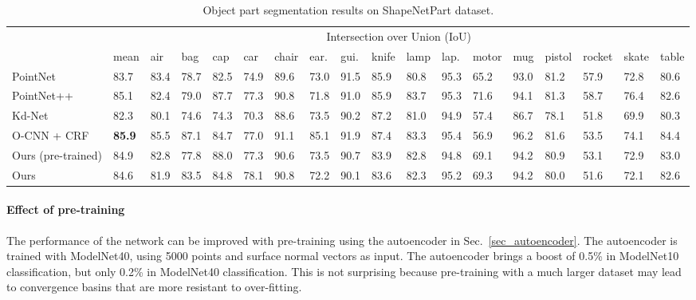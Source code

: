 \documentclass[10pt,twocolumn,letterpaper]{article}
\begin{document}
\begin{table*}[t]
\centering
{
\setlength\tabcolsep{2.1pt} \begin{tabular}{l|lllllllllllllllll}
\hline
\multirow{2}{*}{} & \multicolumn{17}{c}{Intersection over Union (IoU)}                                                                                                 \\ \cline{2-18} 
                  & \multicolumn{1}{l|}{mean} & air  & bag  & cap  & car  & chair & ear. & gui. & knife & lamp & lap. & motor & mug  & pistol & rocket & skate & table \\ \hline
PointNet \cite{qi2016pointnet}          & \multicolumn{1}{l|}{83.7} & 83.4 & 78.7 & 82.5 & 74.9 & 89.6  & 73.0 & 91.5 & 85.9  & 80.8 & 95.3 & 65.2  & 93.0 & 81.2   & 57.9   & 72.8  & 80.6  \\
PointNet++ \cite{qi2017pointnet++}        & \multicolumn{1}{l|}{85.1} & 82.4 & 79.0 & 87.7 & 77.3 & 90.8  & 71.8 & 91.0 & 85.9  & 83.7 & 95.3 & 71.6  & 94.1 & 81.3   & 58.7   & 76.4  & 82.6  \\
Kd-Net \cite{klokov2017escape}            & \multicolumn{1}{l|}{82.3} & 80.1 & 74.6 & 74.3 & 70.3 & 88.6  & 73.5 & 90.2 & 87.2  & 81.0 & 94.9 & 57.4  & 86.7 & 78.1   & 51.8   & 69.9  & 80.3  \\
O-CNN + CRF \cite{wang2017cnn}            & \multicolumn{1}{l|}{\textbf{85.9}} & 85.5 & 87.1 & 84.7 & 77.0 & 91.1  & 85.1 & 91.9 & 87.4  & 83.3 & 95.4 & 56.9  & 96.2 & 81.6   & 53.5   & 74.1  & 84.4  \\ \hline
Ours (pre-trained)             & \multicolumn{1}{l|}{84.9} & 82.8 & 77.8 & 88.0 & 77.3 & 90.6  & 73.5 & 90.7 & 83.9  & 82.8 & 94.8 & 69.1  & 94.2 & 80.9   & 53.1   & 72.9  & 83.0  \\
Ours                   & \multicolumn{1}{l|}{84.6} & 81.9 & 83.5 & 84.8 & 78.1 & 90.8  & 72.2 & 90.1 & 83.6  & 82.3 & 95.2 & 69.3  & 94.2 & 80.0   & 51.6   & 72.1  & 82.6  \\ \hline
\end{tabular}
}
\caption{Object part segmentation results on ShapeNetPart dataset.}
\vspace{-4pt}
\label{tbl_seg}
\end{table*}


\paragraph{Effect of pre-training}
The performance of the network can be improved with pre-training using the autoencoder in Sec.~\ref{sec_autoencoder}. The autoencoder is trained with ModelNet40, using 5000 points and surface normal vectors as input. The autoencoder brings a boost of 0.5\% in ModelNet10 classification, but only 0.2\% in ModelNet40 classification. This is not surprising because pre-training with a much larger dataset may lead to convergence basins \cite{erhan2010does} that are more resistant to over-fitting.
\end{document}
